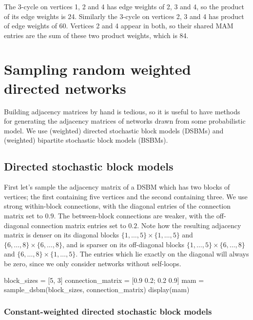 \documentclass{article}
\begin{document}
The 3-cycle on vertices 1, 2 and 4
has edge weights of 2, 3 and 4, so the product of its edge weights is 24.
Similarly the 3-cycle on vertices 2, 3 and 4 has product of edge weights of 60.
Vertices 2 and 4 appear in both, so their shared MAM entries are the
sum of these two product weights, which is 84.

\section{Sampling random weighted directed networks}

Building adjacency matrices by hand is tedious,
so it is useful to have methods for generating
the adjacency matrices of networks drawn from some probabilistic model.
We use (weighted) directed stochastic block models (DSBMs) and
(weighted) bipartite stochastic block models (BSBMs).

\subsection{Directed stochastic block models}

First let's sample the adjacency matrix of a DSBM
which has two blocks of vertices;
the first containing five vertices and the second containing three.
We use strong within-block connections,
with the diagonal entries of the connection matrix set to $0.9$.
The between-block connections are weaker, with the off-diagonal
connection matrix entries set to $0.2$.
Note how the resulting adjacency matrix is denser
on its diagonal blocks
$\{1, \dots, 5\} \times \{1, \dots, 5\}$
and
$\{6, \dots, 8\} \times \{6, \dots, 8\}$,
and is sparser on its off-diagonal blocks
$\{1, \dots, 5\} \times \{6, \dots, 8\}$
and
$\{6, \dots, 8\} \times \{1, \dots, 5\}$.
The entries which lie exactly on the diagonal will
always be zero,
since we only consider networks without self-loops.

\begin{tcolorbox}[colback=black!5!white,colframe=black!15!white]
\begin{juliablock}
block_sizes = [5, 3]
connection_matrix = [0.9 0.2; 0.2 0.9]
mam = sample_dsbm(block_sizes, connection_matrix)
display(mam)
\end{juliablock}
\texttt{\obeylines\printpythontex}
\end{tcolorbox}

\subsubsection{Constant-weighted directed stochastic block models}
\end{document}
